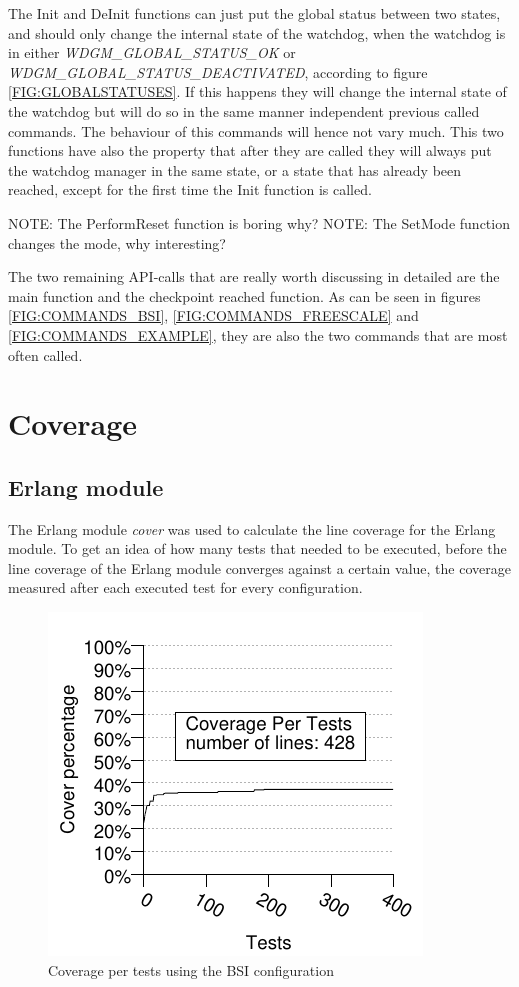 The Init and DeInit functions can just put the global
status between two states, and should only change the internal state of the
watchdog, when the watchdog is in either \emph{WDGM\_GLOBAL\_STATUS\_OK}
or \emph{WDGM\_GLOBAL\_STATUS\_DEACTIVATED}, according to
figure \ref{FIG:GLOBALSTATUSES}. If this happens they will change the internal
state of the watchdog but will do so in the same manner independent previous
called commands. The behaviour of this commands will hence not vary much.
This two functions have also the property that after they are called they will
always put the watchdog manager in the same state, or a state that has already
been reached, except for the first time the Init function is called.

NOTE: The PerformReset function is boring why?
NOTE: The SetMode function changes the mode, why interesting?

The two remaining API-calls that are really worth discussing in detailed are the
main function and the checkpoint reached function. As can be seen in
figures \ref{FIG:COMMANDS_BSI}, \ref{FIG:COMMANDS_FREESCALE} and
\ref{FIG:COMMANDS_EXAMPLE}, they are also the two commands that are most
often called.

\section{Coverage}
\subsection{Erlang module}
\newcommand{\linecoverage}{97.38\%}
\newcommand{\bullseyecoverage}{81\%}
The Erlang module \emph{cover} was used to calculate the line coverage for the
Erlang module.
To get an idea of how many tests that needed to be executed, before the line
coverage of the Erlang module converges against a certain value,
the coverage measured after each executed test for every configuration.

\begin{figure}[!ht]
\begin{center}
\includegraphics{generated_pictures/coverage_per_tests_bsi.pdf}
\end{center}
\caption{Coverage per tests using the BSI configuration}
\label{FIG:COV_PER_TESTS_BSI}
\end{figure}

